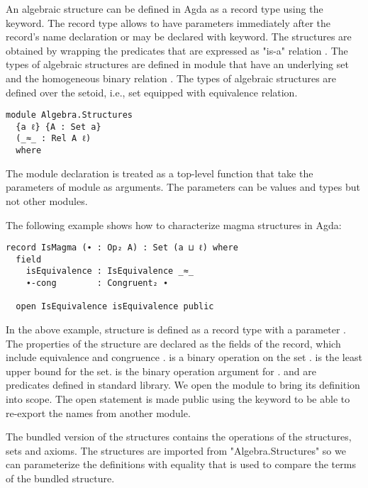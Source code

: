 An algebraic structure can be defined in Agda as a record type using the
 keyword. The record type allows to have parameters immediately
after the record's name declaration or may be declared with 
keyword. The structures are obtained by wrapping the predicates that are
expressed as "is-a" relation \cite{hu2021formalizing}. The types of algebraic
structures are defined in module  that have an
underlying set  and the homogeneous binary relation . The
types of algebraic structures are defined over the setoid, i.e., set equipped
with equivalence relation. 

\begin{verbatim}
module Algebra.Structures
  {a ℓ} {A : Set a} 
  (_≈_ : Rel A ℓ)    
  where
\end{verbatim}

The module declaration is treated as a top-level function that take the
parameters of module as arguments. The parameters can be values and types but
not other modules.

The following example shows how to characterize magma
structures in Agda:
\begin{verbatim}
record IsMagma (∙ : Op₂ A) : Set (a ⊔ ℓ) where
  field
    isEquivalence : IsEquivalence _≈_
    ∙-cong        : Congruent₂ ∙

  open IsEquivalence isEquivalence public
\end{verbatim}

In the above example, structure  is defined as a record type
with a parameter . The properties of the structure
 are declared as the fields of the record, which include
equivalence  and congruence .  is
a binary operation on the set .  is the least upper
bound for the set.  is the binary operation argument for
.  and  are
predicates defined in standard library. We open the module
 to bring its definition into scope. The open statement is
made public using the keyword  to be able to re-export the names
from another module.

The bundled version of the structures contains the operations of the structures,
sets and axioms. The structures are imported from "Algebra.Structures" so we can
parameterize the definitions with equality that is used to compare the terms of
the bundled structure.

